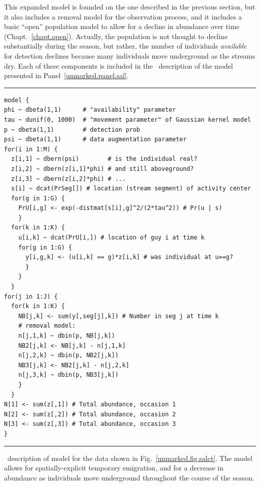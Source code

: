 This expanded model is founded on the one described in the previous
section, but it also includes a removal model for the observation
process, and it includes a basic ``open'' population model to allow
for a decline in abundance over time
(Chapt.~\ref{chapt.open}). Actually, the population is not thought to
decline substantially during the season, but rather, the
number of individuals \textit{available} for detection declines
because many individuals move underground as the streams dry. Each of
these components is included in the \bugs~description of the
model presented in Panel~\ref{unmarked.panel.sal}.


\begin{panel}[ht]
\centering
\rule[0.05in]{\textwidth}{.03in}
\begin{small}
\begin{verbatim}
model {
phi ~ dbeta(1,1)      # "availability" parameter
tau ~ dunif(0, 1000)  # "movement parameter" of Gaussian kernel model
p ~ dbeta(1,1)        # detection prob
psi ~ dbeta(1,1)      # data augmentation parameter
for(i in 1:M) {
  z[i,1] ~ dbern(psi)        # is the individual real?
  z[i,2] ~ dbern(z[i,1]*phi) # and still aboveground?
  z[i,3] ~ dbern(z[i,2]*phi) # ...
  s[i] ~ dcat(PrSeg[]) # location (stream segment) of activity center
  for(g in 1:G) {
    PrU[i,g] <- exp(-distmat[s[i],g]^2/(2*tau^2)) # Pr(u | s)
    }
  for(k in 1:K) {
    u[i,k] ~ dcat(PrU[i,]) # location of guy i at time k
    for(g in 1:G) {
      y[i,g,k] <- (u[i,k] == g)*z[i,k] # was individual at u==g?
      }
    }
  }
for(j in 1:J) {
  for(k in 1:K) {
    NB[j,k] <- sum(y[,seg[j],k]) # Number in seg j at time k
    # removal model:
    n[j,1,k] ~ dbin(p, NB[j,k])
    NB2[j,k] <- NB[j,k] - n[j,1,k]
    n[j,2,k] ~ dbin(p, NB2[j,k])
    NB3[j,k] <- NB2[j,k] - n[j,2,k]
    n[j,3,k] ~ dbin(p, NB3[j,k])
    }
  }
N[1] <- sum(z[,1]) # Total abundance, occasion 1
N[2] <- sum(z[,2]) # Total abundance, occasion 2
N[3] <- sum(z[,3]) # Total abundance, occasion 3
}
\end{verbatim}
\end{small}
\rule[0.05in]{\textwidth}{.03in}
\caption{\bugs~description of model for the data shown in
  Fig.~\ref{unmarked.fig.salct}. The model allows for
  spatially-explicit temporary emigration, and for a decrease in
  abundance as individuals move underground throughout the course of
  the season.}
\label{unmarked.panel.sal}
\end{panel}

